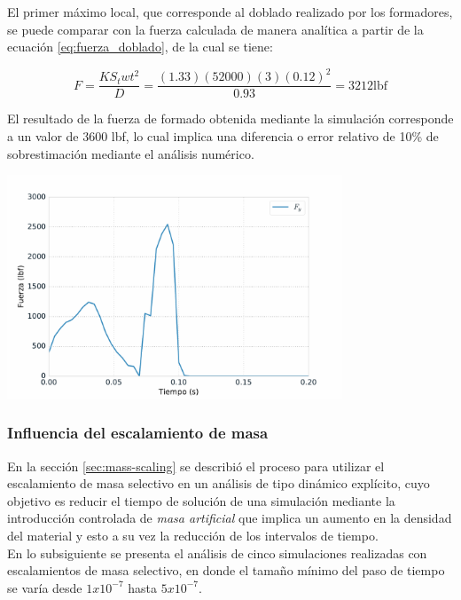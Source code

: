 El primer máximo local, que corresponde al doblado realizado por los formadores, se puede 
comparar con la fuerza calculada de manera analítica a partir de la ecuación \ref{eq:fuerza_doblado}, 
de la cual se tiene:

$$
F = \frac{K S_{t} w t^2}{D} = \frac{(1.33)(52000)(3)(0.12)^2}{0.93} = 3212 \text{lbf}
$$

El resultado de la fuerza de formado obtenida mediante la simulación corresponde a un valor de 
3600 lbf, lo cual implica una diferencia o error relativo de 10\% de sobrestimación mediante 
el análisis numérico.

\begin{center}
\includegraphics[width=0.75\textwidth]{src/ch4/nodal_force_01.pdf}
\label{fig:nodal_force_01}
\end{center}

\subsubsection{Influencia del escalamiento de masa}\label{sec:mass-scaling-results}

En la sección \ref{sec:mass-scaling} se describió el proceso para utilizar el escalamiento de masa 
selectivo en un análisis de tipo dinámico explícito, cuyo objetivo es reducir el tiempo de 
solución de una simulación mediante la introducción controlada de \textit{masa artificial} que implica 
un aumento en la densidad del material y esto a su vez la reducción de los intervalos de tiempo.\\

En lo subsiguiente se presenta el análisis de cinco simulaciones realizadas con escalamientos de 
masa selectivo, en donde el tamaño mínimo del paso de tiempo se varía desde $1x10^{-7}$ hasta 
$5x10^{-7}$.\\

